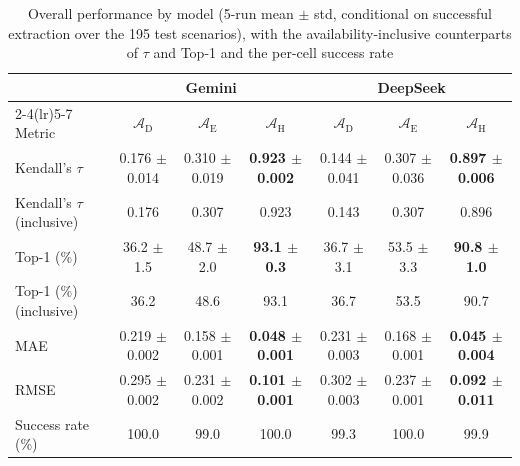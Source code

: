 \documentclass[11pt]{article}
\begin{document}
\begin{table}[htbp]
\centering
\footnotesize
\centering
\caption{Overall performance by model (5-run mean $\pm$ std, conditional on successful extraction over the 195 test scenarios), with the availability-inclusive counterparts of $\tau$ and Top-1 and the per-cell success rate}
\label{tab:overall_by_model}
\renewcommand{\arraystretch}{1.10}
\begin{tabular}{lcccccc}
\toprule
 & \multicolumn{3}{c}{Gemini} & \multicolumn{3}{c}{DeepSeek} \\
\cmidrule(lr){2-4}\cmidrule(lr){5-7}
Metric & $\mathcal{A}_{\text{D}}$ & $\mathcal{A}_{\text{E}}$ & $\mathcal{A}_{\text{H}}$ & $\mathcal{A}_{\text{D}}$ & $\mathcal{A}_{\text{E}}$ & $\mathcal{A}_{\text{H}}$ \\
\midrule
Kendall's $\tau$ & 0.176 $\pm$ 0.014 & 0.310 $\pm$ 0.019 & \textbf{0.923 $\pm$ 0.002} & 0.144 $\pm$ 0.041 & 0.307 $\pm$ 0.036 & \textbf{0.897 $\pm$ 0.006} \\
Kendall's $\tau$ (inclusive) & 0.176 & 0.307 & 0.923 & 0.143 & 0.307 & 0.896 \\
Top-1 (\%) & 36.2 $\pm$ 1.5 & 48.7 $\pm$ 2.0 & \textbf{93.1 $\pm$ 0.3} & 36.7 $\pm$ 3.1 & 53.5 $\pm$ 3.3 & \textbf{90.8 $\pm$ 1.0} \\
Top-1 (\%) (inclusive) & 36.2 & 48.6 & 93.1 & 36.7 & 53.5 & 90.7 \\
MAE & 0.219 $\pm$ 0.002 & 0.158 $\pm$ 0.001 & \textbf{0.048 $\pm$ 0.001} & 0.231 $\pm$ 0.003 & 0.168 $\pm$ 0.001 & \textbf{0.045 $\pm$ 0.004} \\
RMSE & 0.295 $\pm$ 0.002 & 0.231 $\pm$ 0.002 & \textbf{0.101 $\pm$ 0.001} & 0.302 $\pm$ 0.003 & 0.237 $\pm$ 0.001 & \textbf{0.092 $\pm$ 0.011} \\
Success rate (\%) & 100.0 & 99.0 & 100.0 & 99.3 & 100.0 & 99.9 \\
\bottomrule
\end{tabular}

\medskip


\end{table}
\end{document}
